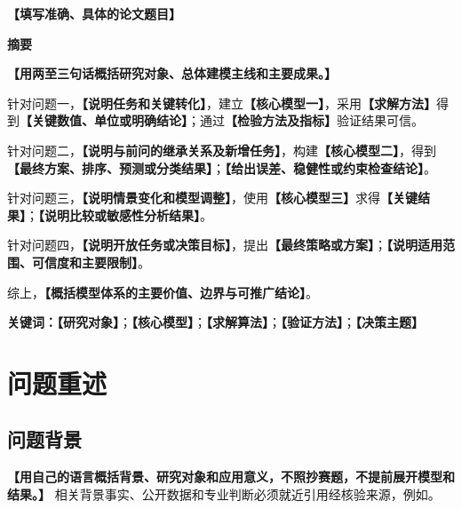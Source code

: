 \documentclass[UTF8,a4paper,12pt,zihao=-4]{ctexart}
\newcommand{\TemplateField}[1]{\textbf{【#1】}}
\newcommand{\PaperTitle}{\TemplateField{填写准确、具体的论文题目}}
\begin{document}
\setcounter{page}{1}

\thispagestyle{fancy}
\begin{center}
  {\bfseries{}\PaperTitle\par}
  \vspace{1.2em}
  {\bfseries{}摘要\par}
\end{center}

\TemplateField{用两至三句话概括研究对象、总体建模主线和主要成果。}

针对问题一，\TemplateField{说明任务和关键转化}，建立\textbf{【核心模型一】}，采用\TemplateField{求解方法}得到\textbf{【关键数值、单位或明确结论】}；通过\TemplateField{检验方法及指标}验证结果可信。

针对问题二，\TemplateField{说明与前问的继承关系及新增任务}，构建\textbf{【核心模型二】}，得到\textbf{【最终方案、排序、预测或分类结果】}；\TemplateField{给出误差、稳健性或约束检查结论}。

针对问题三，\TemplateField{说明情景变化和模型调整}，使用\textbf{【核心模型三】}求得\textbf{【关键结果】}；\TemplateField{说明比较或敏感性分析结果}。

针对问题四，\TemplateField{说明开放任务或决策目标}，提出\textbf{【最终策略或方案】}；\TemplateField{说明适用范围、可信度和主要限制}。

综上，\textbf{【概括模型体系的主要价值、边界与可推广结论】}。

\vspace{0.8em}
\noindent\textbf{关键词：}\TemplateField{研究对象}；\TemplateField{核心模型}；\TemplateField{求解算法}；\TemplateField{验证方法}；\TemplateField{决策主题}

\clearpage

\section{问题重述}

\subsection{问题背景}
\TemplateField{用自己的语言概括背景、研究对象和应用意义，不照抄赛题，不提前展开模型和结果。}
相关背景事实、公开数据和专业判断必须就近引用经核验来源，例如\cite{topic-ref-1,topic-ref-2}。
\end{document}
